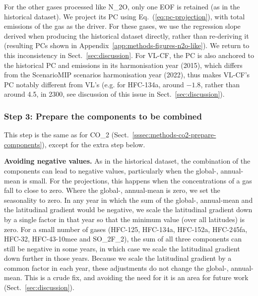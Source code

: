 For the other gases processed like N_2O, only one EOF is retained (as in the historical dataset).
We project its PC using Eq.~(\ref{eq:pc-projection}),
with total emissions of the gas as the driver.
For these gases, we use the regression slope derived when producing the historical dataset \citep{nicholls_historical-ghgs_2026} directly,
rather than re-deriving it (resulting PCs shown in Appendix~\ref{app:methods-figures-n2o-like}).
We return to this inconsistency in Sect.~\ref{sec:discussion}.
For VL-CF, the PC is also anchored to the historical PC and emissions in its harmonisation year (2015),
which differs from the ScenarioMIP scenarios harmonisation year (2022),
thus makes VL-CF's PC notably different from VL's
(e.g. for HFC-134a, around $-1.8$, rather than around 4.5, in 2300,
see discussion of this issue in Sect.~\ref{sec:discussion}).

\subsubsection{Step 3: Prepare the components to be combined}
\label{sssec:methods-n2o-like-prepare-components}

This step is the same as for CO_2 (Sect.~\ref{sssec:methods-co2-prepare-components}),
except for the extra step below.

\textbf{Avoiding negative values.}
As in the historical dataset, the combination of the components can lead to negative values,
particularly when the global-, annual-mean is small.
For the projections, this happens when the concentrations of a gas fall to close to zero.
Where the global-, annual-mean is zero, we set the seasonality to zero.
In any year in which the sum of the global-, annual-mean and the latitudinal gradient would be negative,
we scale the latitudinal gradient down by a single factor in that year
so that the minimum value (over all latitudes) is zero.
For a small number of gases
(HFC-125, HFC-134a, HFC-152a, HFC-245fa, HFC-32, HFC-43-10mee and SO_2F_2),
the sum of all three components can still be negative in some years,
in which case we scale the latitudinal gradient down further in those years.
Because we scale the latitudinal gradient by a common factor in each year,
these adjustments do not change the global-, annual-mean.
This is a crude fix,
and avoiding the need for it is an area for future work (Sect.~\ref{sec:discussion}).


